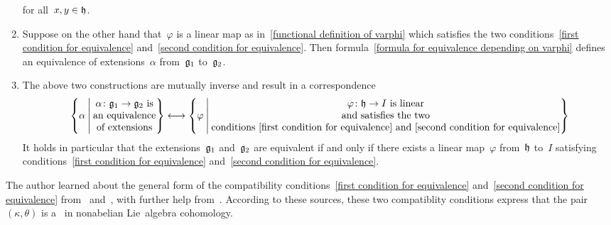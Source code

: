 \begin{theorem}
\begin{enumerate}[resume*]
      for all~$x, y \in \mathfrak{h}$.
    \item
      Suppose on the other hand that~$\varphi$ is a linear map as in~\eqref{functional definition of varphi} which satisfies the two conditions~\eqref{first condition for equivalence} and~\eqref{second condition for equivalence}.
      Then formula~\eqref{formula for equivalence depending on varphi} defines an equivalence of extensions~$\alpha$ from~$\mathfrak{g}_1$ to~$\mathfrak{g}_2$.
    \item
      The above two constructions are mutually inverse and result in a {\onetoonetext} correspondence
      \[
        \left\{
          \alpha
        \suchthat*
          \begin{tabular}{@{}c@{}}
            $\alpha \colon \glie_1 \to \glie_2$ is \\
            an equivalence \\
            of extensions
          \end{tabular}
        \right\}
        \onetoone
        \left\{
          \varphi
        \suchthat*
          \begin{tabular}{@{}c@{}}
            $\varphi \colon \hlie \to I$ is linear \\
            and satisfies the two \\
            conditions~\eqref{first condition for equivalence} and~\eqref{second condition for equivalence}
          \end{tabular}
        \right\}
      \]
      It holds in particular that the extensions~$\mathfrak{g}_1$ and~$\mathfrak{g}_2$ are equivalent if and only if there exists a linear map~$\varphi$ from~$\mathfrak{h}$ to~$I$ satisfying conditions~\eqref{first condition for equivalence} and~\eqref{second condition for equivalence}.
  \end{enumerate}
\end{theorem}


\begin{remark}
  The author learned about the general form of the compatibility conditions~\eqref{first condition for equivalence} and~\eqref{second condition for equivalence} from~\cite{extension_of_lie_algebras_nlab} and~\cite{nonabelian_lie_algebra_cohomology_nlab}, with further help from~\cite{extension_of_lie_algebras_arxiv}.
  According to these sources, these two compatiblity conditions express that the pair~$(\kappa, \theta)$ is a~ in nonabelian Lie~algebra cohomology.
\end{remark}


